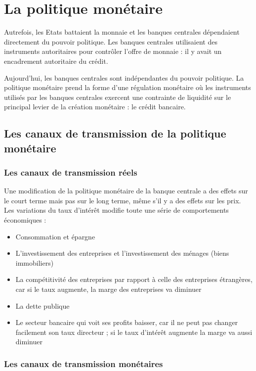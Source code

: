 \chapter{La politique monétaire}

Autrefois, les Etats battaient la monnaie et les banques centrales dépendaient directement du pouvoir politique. Les banques centrales utilisaient des instruments autoritaires pour contrôler l'offre de monnaie : il y avait un encadrement autoritaire du crédit.

Aujourd'hui, les banques centrales sont indépendantes du pouvoir politique. La politique monétaire prend la forme d'une régulation monétaire où les instruments utilisés par les banques centrales exercent une contrainte de liquidité sur le principal levier de la création monétaire : le crédit bancaire.

\section{Les canaux de transmission de la politique monétaire}

	\subsection{Les canaux de transmission réels}

Une modification de la politique monétaire de la banque centrale a des effets sur le court terme mais pas sur le long terme, même s'il y a des effets sur les prix.  Les variations du taux d'intérêt modifie toute une série de comportements économiques :

\begin{itemize}
	\item Consommation et épargne
	\item L'investissement des entreprises et l'investissement des ménages (biens immobiliers)
	\item La compétitivité des entreprises par rapport à celle des entreprises étrangères, car si le taux augmente, la marge des entreprises va diminuer
	\item La dette publique
	\item Le secteur bancaire qui voit ses profits baisser, car il ne peut pas changer facilement son taux directeur ; si le taux d'intérêt augmente la marge va aussi diminuer
\end{itemize}

	\subsection{Les canaux de transmission monétaires}
	

